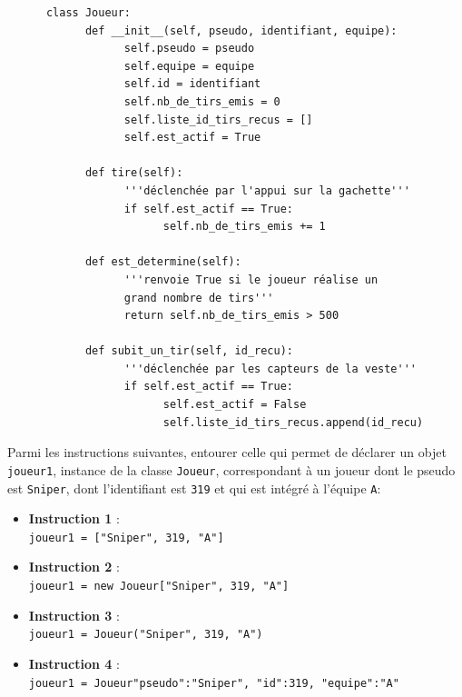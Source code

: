 \documentclass[a4paper,12pt,eval,firamath]{nsi}
\begin{document}
\begin{pyc}
      \begin{verbatim}
      class Joueur:
            def __init__(self, pseudo, identifiant, equipe):
                  self.pseudo = pseudo
                  self.equipe = equipe
                  self.id = identifiant
                  self.nb_de_tirs_emis = 0
                  self.liste_id_tirs_recus = []
                  self.est_actif = True
            
            def tire(self):
                  '''déclenchée par l'appui sur la gachette'''
                  if self.est_actif == True:
                        self.nb_de_tirs_emis += 1
            
            def est_determine(self):
                  '''renvoie True si le joueur réalise un
                  grand nombre de tirs'''
                  return self.nb_de_tirs_emis > 500
            
            def subit_un_tir(self, id_recu):
                  '''déclenchée par les capteurs de la veste'''
                  if self.est_actif == True:
                        self.est_actif = False
                        self.liste_id_tirs_recus.append(id_recu)            
\end{verbatim}
\end{pyc}
\question Parmi les instructions suivantes, entourer celle qui permet de déclarer un objet
\texttt{joueur1}, instance de la classe \texttt{Joueur}, correspondant à un joueur dont le pseudo est \texttt{Sniper}, dont l'identifiant est \texttt{319} et qui est intégré à l'équipe \texttt{A}:
\begin{itemize}
      \item \textbf{Instruction 1} :\\ \texttt{joueur1 = ["Sniper", 319, "A"]}
      \item \textbf{Instruction 2} :\\ \texttt{joueur1 = new Joueur["Sniper", 319, "A"]}
      \item \textbf{Instruction 3} :\\ \texttt{joueur1 = Joueur("Sniper", 319, "A")}
      \item \textbf{Instruction 4} :\\ \texttt{joueur1 = Joueur{"pseudo":"Sniper", "id":319, "equipe":"A"}}
\end{itemize}
\end{document}
